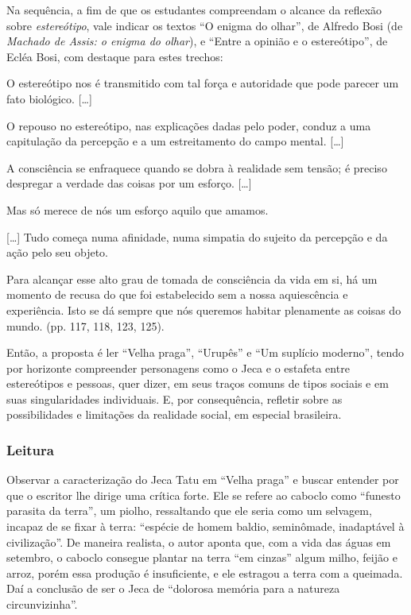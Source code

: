 \documentclass[11pt]{extarticle}
\begin{document}
Na sequência, a fim de que os estudantes compreendam o alcance da
reflexão sobre \emph{estereótipo}, vale indicar os textos ``O enigma do
olhar'', de Alfredo Bosi (de \emph{Machado de Assis: o enigma do
olhar}), e ``Entre a opinião e o estereótipo'', de Ecléa Bosi, com
destaque para estes trechos:

O estereótipo nos é transmitido com tal força e autoridade que pode
parecer um fato biológico. {[}\ldots{}{]}

O repouso no estereótipo, nas explicações dadas pelo poder, conduz a uma
capitulação da percepção e a um estreitamento do campo mental.
{[}\ldots{}{]}

A consciência se enfraquece quando se dobra à realidade sem tensão; é
preciso despregar a verdade das coisas por um esforço. {[}\ldots{}{]}

Mas só merece de nós um esforço aquilo que amamos.

{[}\ldots{}{]} Tudo começa numa afinidade, numa simpatia do sujeito da
percepção e da ação pelo seu objeto.

Para alcançar esse alto grau de tomada de consciência da vida em si, há
um momento de recusa do que foi estabelecido sem a nossa aquiescência e
experiência. Isto se dá sempre que nós queremos habitar plenamente as
coisas do mundo. (pp. 117, 118, 123, 125).

Então, a proposta é ler ``Velha praga'', ``Urupês'' e ``Um suplício
moderno'', tendo por horizonte compreender personagens como o Jeca e o
estafeta entre estereótipos e pessoas, quer dizer, em seus traços comuns
de tipos sociais e em suas singularidades individuais. E, por
consequência, refletir sobre as possibilidades e limitações da realidade
social, em especial brasileira.


\subsubsection{Leitura}

Observar a caracterização do Jeca Tatu em ``Velha praga'' e buscar
entender por que o escritor lhe dirige uma crítica forte. Ele se refere
ao caboclo como ``funesto parasita da terra'', um piolho, ressaltando
que ele seria como um selvagem, incapaz de se fixar à terra: ``espécie
de homem baldio, seminômade, inadaptável à civilização''. De maneira
realista, o autor aponta que, com a vida das águas em setembro, o
caboclo consegue plantar na terra ``em cinzas'' algum milho, feijão e
arroz, porém essa produção é insuficiente, e ele estragou a terra com a
queimada. Daí a conclusão de ser o Jeca de ``dolorosa memória para a
natureza circunvizinha''.
\end{document}

